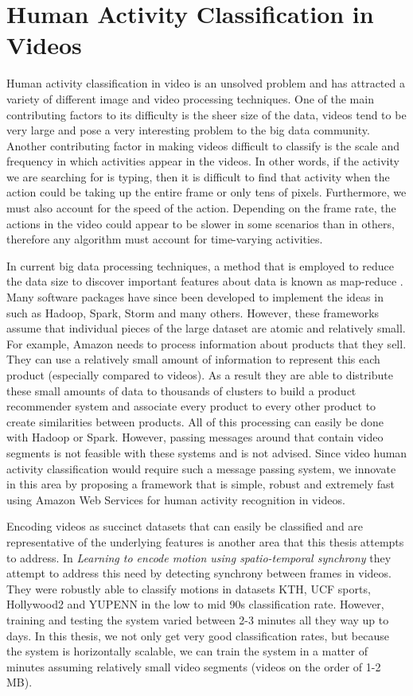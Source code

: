 \section{\label{section:activity_classification}Human Activity Classification in Videos}
Human activity classification in video is an unsolved problem and has attracted
a variety of different image and video processing techniques. One of the main
contributing factors to its difficulty is the sheer size of the data, videos
tend to be very large and pose a very interesting problem to the big data
community. Another contributing factor in making videos difficult to classify is
the scale and frequency in which activities appear in the videos. In other
words, if the activity we are searching for is typing, then it is difficult to
find that activity when the action could be taking up the entire frame or only
tens of pixels. Furthermore, we must also account for the speed of the action.
Depending on the frame rate, the actions in the video could appear to be slower
in some scenarios than in others, therefore any algorithm must account for
time-varying activities.

In current big data processing techniques, a method that is employed to reduce
the data size to discover important features about data is known as map-reduce
\cite{dean2008mapreduce}. Many software packages have since been developed to
implement the ideas in \cite{dean2008mapreduce} such as Hadoop, Spark, Storm
and many others. However, these frameworks assume that individual pieces of the
large dataset are atomic and relatively small. For example, Amazon needs to process
information about products that they sell. They can use a relatively small amount
of information to represent this each product (especially compared to videos).
As a result they are able to distribute these small amounts of data to thousands
of clusters to build a product recommender system and associate every product to
every other product to create similarities between products. All of this processing
can easily be done with Hadoop\cite{White:2009:HDG:1717298} or Spark. However,
passing messages around that contain video segments is not feasible with these
systems and is not advised. Since video human activity classification would
require such a message passing system, we innovate in this area by proposing a
framework that is simple, robust and extremely fast using Amazon Web Services
for human activity recognition in videos.

Encoding videos as succinct datasets that can easily be classified and are
representative of the underlying features is another area that this thesis
attempts to address. In \textit{Learning to encode motion using spatio-temporal
synchrony} \cite{konda2013learning} they attempt to address this need by detecting
synchrony between frames in videos. They were robustly able to classify motions in
datasets KTH, UCF sports, Hollywood2 and YUPENN in the low to mid 90s classification
rate. However, training and testing the system varied between 2-3 minutes all
they way up to days. In this thesis, we not only get very good classification
rates, but because the system is horizontally scalable, we can train the system
in a matter of minutes assuming relatively small video segments (videos on the
order of 1-2 MB).

